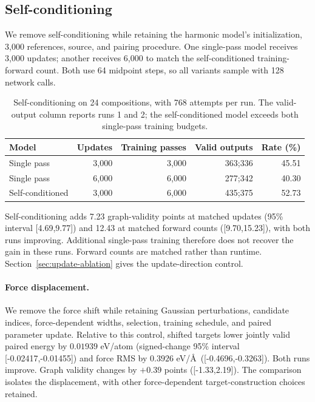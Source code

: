 \subsection{Self-conditioning}\label{sec:sc-ablation}
We remove self-conditioning while retaining the harmonic model's initialization, 3,000 references, source, and pairing procedure. One single-pass model receives 3,000 updates; another receives 6,000 to match the self-conditioned training-forward count. Both use 64 midpoint steps, so all variants sample with 128 network calls.

\begin{table}[t]
\centering
\caption{Self-conditioning on 24 compositions, with 768 attempts per run. The valid-output column reports runs 1 and 2; the self-conditioned model exceeds both single-pass training budgets.}
\begin{tabular}{lrrrr}
\toprule
Model & Updates & Training passes & Valid outputs & Rate (\%)\\
\midrule
Single pass &3,000&3,000&363;336&45.51\\
Single pass &6,000&6,000&277;342&40.30\\
Self-conditioned &3,000&6,000&435;375&52.73\\
\bottomrule
\end{tabular}\label{tab:sc-ablation}
\end{table}

Self-conditioning adds 7.23 graph-validity points at matched updates (95\% interval [4.69,9.77]) and 12.43 at matched forward counts ([9.70,15.23]), with both runs improving. Additional single-pass training therefore does not recover the gain in these runs. Forward counts are matched rather than runtime. Section~\ref{sec:update-ablation} gives the update-direction control.

\paragraph{Force displacement.}
We remove the force shift while retaining Gaussian perturbations, candidate indices, force-dependent widths, selection, training schedule, and paired parameter update. Relative to this control, shifted targets lower jointly valid paired energy by $0.01939$ eV/atom (signed-change 95\% interval [-0.02417,-0.01455]) and force RMS by $0.3926$ eV/\AA\ ([-0.4696,-0.3263]). Both runs improve. Graph validity changes by $+0.39$ points ([-1.33,2.19]). The comparison isolates the displacement, with other force-dependent target-construction choices retained.
